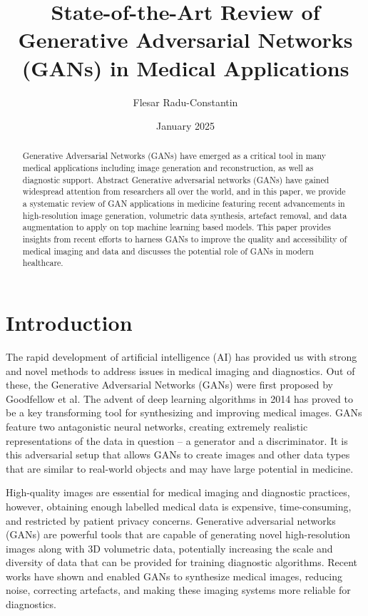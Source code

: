 \documentclass[12pt]{article}
\title{State-of-the-Art Review of Generative Adversarial Networks (GANs) in Medical Applications}
\author{Flesar Radu-Constantin}
\date{January 2025}
\begin{document}
\maketitle

\begin{abstract}
Generative Adversarial Networks (GANs) have emerged as a critical tool in many medical applications including image generation and reconstruction, as well as diagnostic support. Abstract Generative adversarial networks (GANs) have gained widespread attention from researchers all over the world, and in this paper, we provide a systematic review of GAN applications in medicine featuring recent advancements in high-resolution image generation, volumetric data synthesis, artefact removal, and data augmentation to apply on top machine learning based models. This paper provides insights from recent efforts to harness GANs to improve the quality and accessibility of medical imaging and data and discusses the potential role of GANs in modern healthcare.
\end{abstract}

\section{Introduction}

The rapid development of artificial intelligence (AI) has provided us with strong and novel methods to address issues in medical imaging and diagnostics. Out of these, the Generative Adversarial Networks (GANs) were first proposed by Goodfellow et al. The advent of deep learning algorithms in 2014 has proved to be a key transforming tool for synthesizing and improving medical images. GANs feature two antagonistic neural networks, creating extremely realistic representations of the data in question – a generator and a discriminator. It is this adversarial setup that allows GANs to create images and other data types that are similar to real-world objects and may have large potential in medicine.

High-quality images are essential for medical imaging and diagnostic practices, however, obtaining enough labelled medical data is expensive, time-consuming, and restricted by patient privacy concerns. Generative adversarial networks (GANs) are powerful tools that are capable of generating novel high-resolution images along with 3D volumetric data, potentially increasing the scale and diversity of data that can be provided for training diagnostic algorithms. Recent works have shown and enabled GANs to synthesize medical images, reducing noise, correcting artefacts, and making these imaging systems more reliable for diagnostics.
\end{document}
